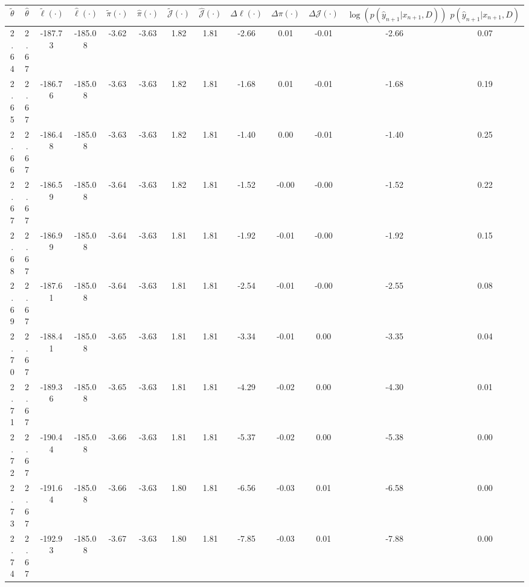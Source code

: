\begin{table}[htbp]
        \centering
        \tiny
        \begin{adjustbox}{angle=90}
            \begin{tabular}{|c|c|c|c|c|c|c|c|c|c|c|c|c|}
                \hline
                 $\tilde{\theta}$ & $\hat{\theta}$ & $\tilde{\ell}(\cdot)$ & $\hat{\ell}(\cdot)$ & $\tilde{\pi}(\cdot)$ & $\hat{\pi}(\cdot)$ & $\tilde{\mathcal{J}}(\cdot)$ & $\hat{\mathcal{J}}(\cdot)$ & $\Delta \ell(\cdot)$ & $\Delta \pi(\cdot)$ & $\Delta \mathcal{J}(\cdot)$ & $\log(p(\hat{y}_{n+1}|x_{n+1}, D))$ & $p(\hat{y}_{n+1}|x_{n+1}, D)$ \\
                \hline
                 2.64 & 2.67 & -187.73 & -185.08 & -3.62 & -3.63 & 1.82 & 1.81 & -2.66 & 0.01 & -0.01 & -2.66 & 0.07\\ \hline
 2.65 & 2.67 & -186.76 & -185.08 & -3.63 & -3.63 & 1.82 & 1.81 & -1.68 & 0.01 & -0.01 & -1.68 & 0.19\\ \hline
 2.66 & 2.67 & -186.48 & -185.08 & -3.63 & -3.63 & 1.82 & 1.81 & -1.40 & 0.00 & -0.01 & -1.40 & 0.25\\ \hline
 2.67 & 2.67 & -186.59 & -185.08 & -3.64 & -3.63 & 1.82 & 1.81 & -1.52 & -0.00 & -0.00 & -1.52 & 0.22\\ \hline
 2.68 & 2.67 & -186.99 & -185.08 & -3.64 & -3.63 & 1.81 & 1.81 & -1.92 & -0.01 & -0.00 & -1.92 & 0.15\\ \hline
 2.69 & 2.67 & -187.61 & -185.08 & -3.64 & -3.63 & 1.81 & 1.81 & -2.54 & -0.01 & -0.00 & -2.55 & 0.08\\ \hline
 2.70 & 2.67 & -188.41 & -185.08 & -3.65 & -3.63 & 1.81 & 1.81 & -3.34 & -0.01 & 0.00 & -3.35 & 0.04\\ \hline
 2.71 & 2.67 & -189.36 & -185.08 & -3.65 & -3.63 & 1.81 & 1.81 & -4.29 & -0.02 & 0.00 & -4.30 & 0.01\\ \hline
 2.72 & 2.67 & -190.44 & -185.08 & -3.66 & -3.63 & 1.81 & 1.81 & -5.37 & -0.02 & 0.00 & -5.38 & 0.00\\ \hline
 2.73 & 2.67 & -191.64 & -185.08 & -3.66 & -3.63 & 1.80 & 1.81 & -6.56 & -0.03 & 0.01 & -6.58 & 0.00\\ \hline
 2.74 & 2.67 & -192.93 & -185.08 & -3.67 & -3.63 & 1.80 & 1.81 & -7.85 & -0.03 & 0.01 & -7.88 & 0.00\\ \hline
            \end{tabular}
        \end{adjustbox}
        \caption{}
        \label{}
    \end{table}
    